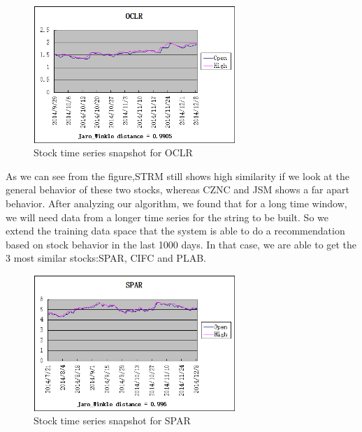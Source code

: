 \documentclass[10pt, conference, compsocconf]{IEEEtran}
\begin{document}
\par
 \begin{figure}[!h]
\vspace{2mm}
\includegraphics[width=3in]{figures/OCLR}
\caption{Stock time series snapshot for OCLR}
\vspace{1mm}
\end{figure}
\par

\vspace{1mm}
\par
As we can see from the figure,STRM still shows high similarity if we look at the general behavior of these two stocks, whereas CZNC and JSM shows a far apart behavior. After analyzing our algorithm, we found that for a long time window, we will need data from a longer time series for the string to be built. So we extend the training data space that the system is able to do a recommendation based on stock behavior in the last 1000 days. In that case, we are able to get the 3 most similar stocks:SPAR, CIFC and PLAB.\\
\par
 \begin{figure}[!h]
\vspace{2mm}
\includegraphics[width=3in]{figures/SPAR}
\caption{Stock time series snapshot for SPAR}
\vspace{1mm}
\end{figure}
\par
\end{document}
